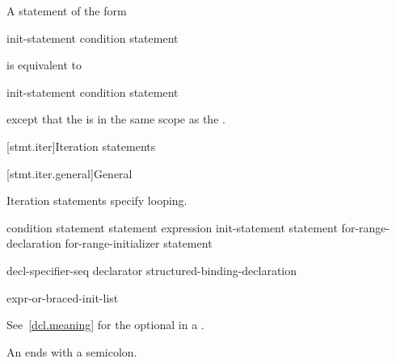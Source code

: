 \pnum
A  statement of the form
\begin{ncsimplebnf}
 \terminal{(} init-statement condition \terminal{)} statement
\end{ncsimplebnf}
is equivalent to
\begin{ncsimplebnf}
\terminal{\{}\br
\bnfindent init-statement\br
\bnfindent {} \terminal{(} condition \terminal{)} statement\br
\terminal{\}}
\end{ncsimplebnf}
except that the  is in
the same scope as the .


[stmt.iter]{Iteration statements}%

[stmt.iter.general]{General}%

\pnum
Iteration statements specify looping.

%
%
%
%
\begin{bnf}
\br
     \terminal{(} condition \terminal{)} statement\br
     statement  \terminal{(} expression \terminal{)} \terminal{;}\br
     \terminal{(} init-statement  \terminal{;}  \terminal{)} statement\br
     \terminal{(}  for-range-declaration \terminal{:} for-range-initializer \terminal{)} statement
\end{bnf}

\begin{bnf}
\br
     decl-specifier-seq declarator\br
    structured-binding-declaration
\end{bnf}

\begin{bnf}
\br
    expr-or-braced-init-list
\end{bnf}

See~\ref{dcl.meaning} for the optional  in a
.
\begin{note}
An  ends with a semicolon.
\end{note}

